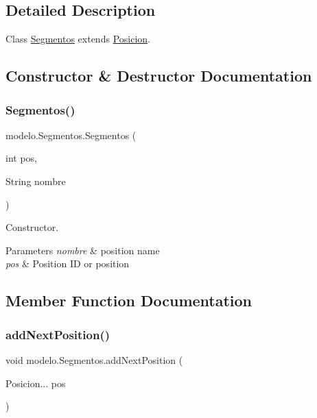 \subsection{Detailed Description}
Class \mbox{\hyperlink{classmodelo_1_1_segmentos}{Segmentos}} extends \mbox{\hyperlink{classmodelo_1_1_posicion}{Posicion}}. 

\subsection{Constructor \& Destructor Documentation}
\mbox{\label{classmodelo_1_1_segmentos_a27b81fdf669238c2851d4208ffbcb43a}} 
\subsubsection{\texorpdfstring{Segmentos()}{Segmentos()}}
{\footnotesize\ttfamily modelo.\+Segmentos.\+Segmentos (\begin{DoxyParamCaption}\item[{int}]{pos,  }\item[{String}]{nombre }\end{DoxyParamCaption})}



Constructor. 


\begin{DoxyParams}{Parameters}
{\em nombre} & position name \\
\hline
{\em pos} & Position ID or position \\
\hline
\end{DoxyParams}


\subsection{Member Function Documentation}
\mbox{\label{classmodelo_1_1_segmentos_a287213096bb01f3a0f7b2944be99242c}} 
\subsubsection{\texorpdfstring{add\+Next\+Position()}{addNextPosition()}}
{\footnotesize\ttfamily void modelo.\+Segmentos.\+add\+Next\+Position (\begin{DoxyParamCaption}\item[{Posicion...}]{pos }\end{DoxyParamCaption})}



